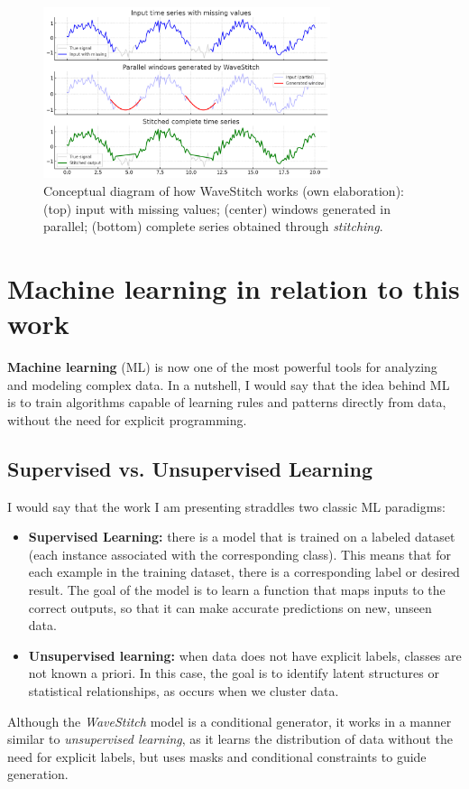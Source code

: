 \begin{figure}[H]
\centering
    \includegraphics[width=0.75\textwidth]{images/esempio_wavestitch.png}
    \caption{Conceptual diagram of how WaveStitch works (own elaboration): (top) input with missing values; (center) windows generated in parallel; (bottom) complete series obtained through \textit{stitching}.}
    \label{fig:wavestitch_schema}
\end{figure}


\section{Machine learning in relation to this work}

\textbf{Machine learning} (ML) is now one of the most powerful tools for analyzing and modeling complex data.  
In a nutshell, I would say that the idea behind ML is to train algorithms capable of learning rules and patterns directly from data, without the need for explicit programming.  

\subsection{Supervised vs. Unsupervised Learning}

I would say that the work I am presenting straddles two classic ML paradigms:

\begin{itemize}
    \item \textbf{Supervised Learning:} there is a model that is trained on a labeled dataset (each instance associated with the corresponding class). This means that for each example in the training dataset, there is a corresponding label or desired result. The goal of the model is to learn a function that maps inputs to the correct outputs, so that it can make accurate predictions on new, unseen data.  

    \item \textbf{Unsupervised learning:} when data does not have explicit labels, classes are not known a priori. In this case, the goal is to identify latent structures or statistical relationships, as occurs when we cluster data.  
\end{itemize}
Although the \emph{WaveStitch} model is a conditional generator, it works in a manner similar to \emph{unsupervised learning}, as it learns the distribution of data without the need for explicit labels, but uses masks and conditional constraints to guide generation.

